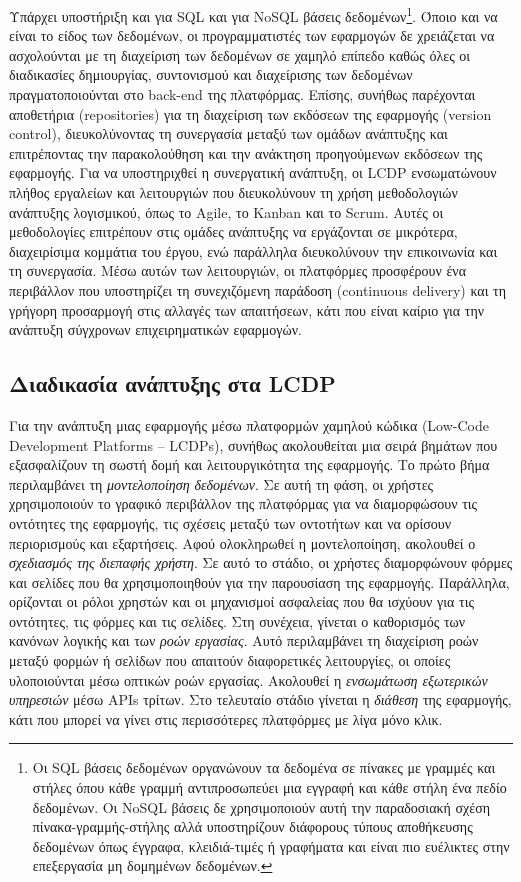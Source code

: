             Υπάρχει υποστήριξη και για SQL και για NoSQL βάσεις δεδομένων\footnote{Οι SQL βάσεις δεδομένων οργανώνουν τα δεδομένα σε πίνακες με γραμμές και στήλες όπου κάθε γραμμή αντιπροσωπεύει μια εγγραφή και κάθε στήλη ένα πεδίο δεδομένων. Οι NoSQL βάσεις δε χρησιμοποιούν αυτή την παραδοσιακή σχέση πίνακα-γραμμής-στήλης αλλά υποστηρίζουν διάφορους τύπους αποθήκευσης δεδομένων όπως έγγραφα, κλειδιά-τιμές ή γραφήματα και είναι πιο ευέλικτες στην επεξεργασία μη δομημένων δεδομένων.}. Όποιο και να είναι το είδος των δεδομένων, οι προγραμματιστές των εφαρμογών δε χρειάζεται να ασχολούνται με τη διαχείριση των δεδομένων σε χαμηλό επίπεδο καθώς όλες οι διαδικασίες δημιουργίας, συντονισμού και διαχείρισης των δεδομένων πραγματοποιούνται στο back-end της πλατφόρμας. Επίσης, συνήθως παρέχονται αποθετήρια (repositories) για τη διαχείριση των εκδόσεων της εφαρμογής (version control), διευκολύνοντας τη συνεργασία μεταξύ των ομάδων ανάπτυξης και επιτρέποντας την παρακολούθηση και την ανάκτηση προηγούμενων εκδόσεων της εφαρμογής. Για να υποστηριχθεί η συνεργατική ανάπτυξη, οι LCDP ενσωματώνουν πλήθος εργαλείων και λειτουργιών που διευκολύνουν τη χρήση μεθοδολογιών ανάπτυξης λογισμικού, όπως το Agile, το Kanban και το Scrum. Αυτές οι μεθοδολογίες επιτρέπουν στις ομάδες ανάπτυξης να εργάζονται σε μικρότερα, διαχειρίσιμα κομμάτια του έργου, ενώ παράλληλα διευκολύνουν την επικοινωνία και τη συνεργασία. Μέσω αυτών των λειτουργιών, οι πλατφόρμες προσφέρουν ένα περιβάλλον που υποστηρίζει τη συνεχιζόμενη παράδοση (continuous delivery) και τη γρήγορη προσαρμογή στις αλλαγές των απαιτήσεων, κάτι που είναι καίριο για την ανάπτυξη σύγχρονων επιχειρηματικών εφαρμογών.

        \subsection{Διαδικασία ανάπτυξης στα LCDP}
            Για την ανάπτυξη μιας εφαρμογής μέσω πλατφορμών χαμηλού κώδικα (Low-Code Development Platforms – LCDPs), συνήθως ακολουθείται μια σειρά βημάτων που εξασφαλίζουν τη σωστή δομή και λειτουργικότητα της εφαρμογής. Το πρώτο βήμα περιλαμβάνει τη \textit{μοντελοποίηση δεδομένων}. Σε αυτή τη φάση, οι χρήστες χρησιμοποιούν το γραφικό περιβάλλον της πλατφόρμας για να διαμορφώσουν τις οντότητες της εφαρμογής, τις σχέσεις μεταξύ των οντοτήτων και να ορίσουν περιορισμούς και εξαρτήσεις. Αφού ολοκληρωθεί η μοντελοποίηση, ακολουθεί ο \textit{σχεδιασμός της διεπαφής χρήστη}. Σε αυτό το στάδιο, οι χρήστες διαμορφώνουν φόρμες και σελίδες που θα χρησιμοποιηθούν για την παρουσίαση της εφαρμογής. Παράλληλα, ορίζονται οι ρόλοι χρηστών και οι μηχανισμοί ασφαλείας που θα ισχύουν για τις οντότητες, τις φόρμες και τις σελίδες. Στη συνέχεια, γίνεται ο καθορισμός των κανόνων λογικής και των \textit{ροών εργασίας}. Αυτό περιλαμβάνει τη διαχείριση ροών μεταξύ φορμών ή σελίδων που απαιτούν διαφορετικές λειτουργίες, οι οποίες υλοποιούνται μέσω οπτικών ροών εργασίας. Ακολουθεί η \textit{ενσωμάτωση εξωτερικών υπηρεσιών} μέσω APIs τρίτων. Στο τελευταίο στάδιο γίνεται η \textit{διάθεση} της εφαρμογής, κάτι που μπορεί να γίνει στις περισσότερες πλατφόρμες με λίγα μόνο κλικ.

